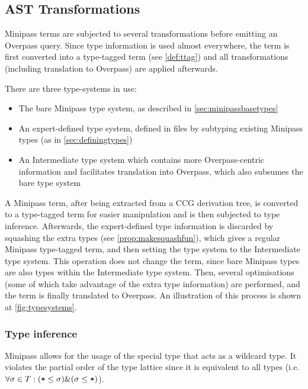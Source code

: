 \documentclass[main.tex]{subfiles}
\begin{document}
\subsection{AST Transformations}
Minipass terms are subjected to several transformations before emitting
an Overpass query. Since type information is used almost everywhere,
the term is first converted into a type-tagged term (see \cref{def:ttag})
and all transformations (including translation to Overpass) are applied
afterwards.

There are three type-systems in use:
\begin{itemize}
    \item The bare Minipass type system, as described in \cref{sec:minipassbasetypes}
    \item An expert-defined type system, defined in  files
        by subtyping existing Minipass types (as in \cref{sec:definingtypes})
    \item An Intermediate type system which contains more Overpass-centric
        information and facilitates translation into Overpass, which
        also subsumes the bare type system
\end{itemize}

A Minipass term, after being extracted from a CCG derivation tree, is converted
to a type-tagged term for easier manipulation and is then subjected to type
inference. Afterwards, the expert-defined type information is discarded
by squashing the extra types (see \cref{prop:makesquashfun}), which gives
a regular Minipass type-tagged term, and then setting the type system to
the Intermediate type system. This operation does not change the term, since
bare Minipass types are also types within the Intermediate type system.
Then, several optimisations (some of which take advantage of the extra type
information) are performed, and the term is finally translated to Overpass.
An illustration of this process is shown at \cref{fig:typesystems}.


\subsubsection{Type inference}
\label{sec:typeinf}
Minipass allows for the usage of the special type \code{*} that acts as a
wildcard type. It violates the partial order of the type lattice since it is
equivalent to all types (i.e. $\forall \sigma \in T: (\text{\mbox{\texttt{*}}} \leq \sigma)
\& (\sigma \leq \text{\mbox{\texttt{*}}})$).
\end{document}
